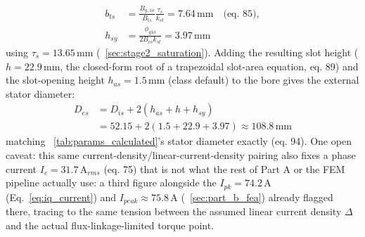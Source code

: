 \documentclass[10pt,final,journal,a4paper,oneside,twocolumn]{IEEEtran}
\begin{document}
\begin{equation}
\label{eq:tooth_yoke}
\begin{aligned}
b_{ts} &= \frac{B_{g,1o}}{B_{ts}}\frac{\tau_s}{k_{st}} = 7.64\,\text{mm} \quad\text{(eq. 85)}, \\
h_{sy} &= \frac{\phi_{g1o}}{2B_{cs}k_{st}} = 3.97\,\text{mm}
\end{aligned}
\end{equation}
using $\tau_s=13.65\,\text{mm}$ (\sectionname~\ref{sec:stage2_saturation}). Adding the resulting slot height ($h=22.9\,\text{mm}$, the closed-form root of a trapezoidal slot-area equation, eq. 89) and the slot-opening height $h_{as}=1.5\,\text{mm}$ (class default) to the bore gives the external stator diameter:
\begin{equation}
\label{eq:stator_od}
\begin{split}
D_{es} &= D_{is} + 2(h_{as}+h+h_{sy}) \\
&= 52.15 + 2(1.5+22.9+3.97) \approx 108.8\,\text{mm}
\end{split}
\end{equation}
matching \tablename~\ref{tab:params_calculated}'s stator diameter exactly (eq. 94). One open caveat: this same current-density/linear-current-density pairing also fixes a phase current $I_c=31.7\,\text{A}_{rms}$ (eq. 75) that is not what the rest of Part A or the FEM pipeline actually use: a third figure alongside the $I_{pk}=74.2\,\text{A}$ (Eq.~\ref{eq:iq_current}) and $I_{peak}\approx75.8\,\text{A}$ (\sectionname~\ref{sec:part_b_fea}) already flagged there, tracing to the same tension between the assumed linear current density $\Delta$ and the actual flux-linkage-limited torque point.
\end{document}
